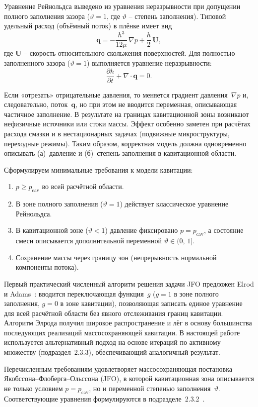 Уравнение Рейнольдса выведено из уравнения неразрывности при
допущении полного заполнения зазора ($\vartheta = 1$, где $\vartheta$ --
степень заполнения).  Типовой удельный расход (объёмный поток) в плёнке имеет вид
\begin{equation}\label{eq:q_film}
  \mathbf{q} = -\frac{h^3}{12\mu}\,\nabla p
    + \frac{h}{2}\,\mathbf{U},
\end{equation}
где $\mathbf{U}$ -- скорость относительного скольжения поверхностей.
Для полностью заполненного зазора ($\vartheta = 1$) выполняется
уравнение неразрывности:
\begin{equation}\label{eq:continuity_film}
  \frac{\partial h}{\partial t} + \nabla \cdot \mathbf{q} = 0.
\end{equation}

Если «отрезать» отрицательные давления, то меняется градиент
давления~$\nabla p$ и, следовательно, поток~$\mathbf{q}$, но при этом
не вводится переменная, описывающая частичное заполнение.  В результате
на границах кавитационной зоны возникают нефизичные источники или стоки
массы.  Эффект особенно заметен при расчётах расхода смазки
и в нестационарных задачах (подвижные микроструктуры, переходные
режимы).  Таким образом, корректная модель должна одновременно
описывать (а)~давление и (б)~степень заполнения в кавитационной
области.

Сформулируем минимальные требования к модели кавитации:
\begin{enumerate}
  \item $p \geq p_{\mathrm{cav}}$ во всей расчётной области.
  \item В зоне полного заполнения ($\vartheta = 1$) действует
        классическое уравнение Рейнольдса.
  \item В кавитационной зоне ($\vartheta < 1$) давление фиксировано
        $p = p_{\mathrm{cav}}$, а состояние смеси описывается
        дополнительной переменной $\vartheta \in (0,\, 1]$.
  \item Сохранение массы через границу зон (непрерывность нормальной компоненты потока).
\end{enumerate}

Первый практический численный алгоритм решения задачи JFO предложен
Elrod и Adams~\cite{elrod1975}: вводится переключающая функция~$g$
($g=1$ в зоне полного заполнения, $g=0$ в зоне кавитации),
позволяющая записать единое уравнение для всей расчётной области
без явного отслеживания границ кавитации.
Алгоритм Элрода получил широкое распространение и лёг в основу
большинства последующих реализаций массосохраняющей кавитации.
В настоящей работе используется альтернативный подход на основе
итераций по активному множеству (подраздел~2.3.3),
обеспечивающий аналогичный результат.

Перечисленным требованиям удовлетворяет массосохраняющая постановка
Якобссона--Флоберга--Ольссона (JFO), в которой кавитационная зона
описывается не только условием $p = p_{\mathrm{cav}}$, но и переменной
степенью заполнения~$\vartheta$.  Соответствующие уравнения формулируются
в подразделе~2.3.2~\cite{dhande2018}.
